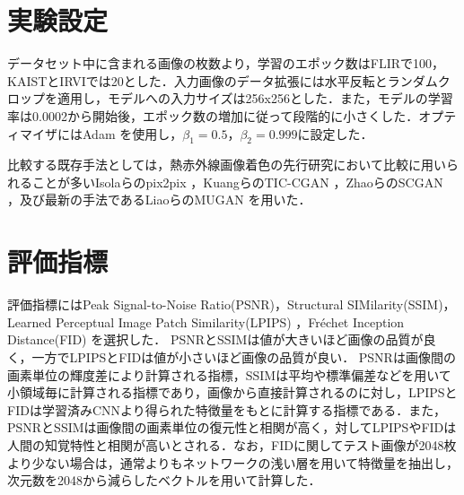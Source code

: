 \documentclass[11pt,dvipdfmx]{ujreport}
\begin{document}
\section{実験設定}
データセット中に含まれる画像の枚数より，学習のエポック数はFLIRで100，KAISTとIRVIでは20とした．入力画像のデータ拡張には水平反転とランダムクロップを適用し，モデルへの入力サイズは256x256とした．また，モデルの学習率は0.0002から開始後，エポック数の増加に従って段階的に小さくした．オプティマイザにはAdam \cite{Kingma_2015_ICLR_Adam} を使用し，$\beta_{1}=0.5$，$\beta_{2}=0.999$に設定した．\par
比較する既存手法としては，熱赤外線画像着色の先行研究において比較に用いられることが多いIsolaらのpix2pix \cite{Isola_2017_CVPR_pix2pix}，KuangらのTIC-CGAN \cite{KUANG_2020_Infrared_TIC-CGAN}，ZhaoらのSCGAN \cite{Zhao_2021_IEEE_SCGAN}，及び最新の手法であるLiaoらのMUGAN \cite{Liao_2023_IEEE_MUGAN} を用いた．


\section{評価指標}
評価指標にはPeak Signal-to-Noise Ratio(PSNR)，Structural SIMilarity(SSIM)，Learned Perceptual Image Patch Similarity(LPIPS) \cite{Zhang_2018_CVPR_LPIPS}，Fréchet Inception Distance(FID) \cite{Heusel_2017_NIPS_FID} を選択した．
PSNRとSSIMは値が大きいほど画像の品質が良く，一方でLPIPSとFIDは値が小さいほど画像の品質が良い．
PSNRは画像間の画素単位の輝度差により計算される指標，SSIMは平均や標準偏差などを用いて小領域毎に計算される指標であり，画像から直接計算されるのに対し，LPIPSとFIDは学習済みCNNより得られた特徴量をもとに計算する指標である．また，PSNRとSSIMは画像間の画素単位の復元性と相関が高く，対してLPIPSやFIDは人間の知覚特性と相関が高いとされる．なお，FIDに関してテスト画像が2048枚より少ない場合は，通常よりもネットワークの浅い層を用いて特徴量を抽出し，次元数を2048から減らしたベクトルを用いて計算した．
\end{document}
